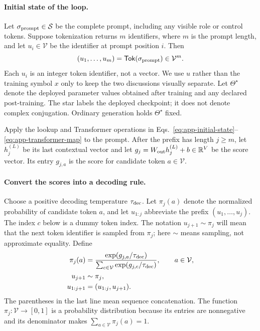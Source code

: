 \documentclass[
  aps,
  reprint,
  superscriptaddress,
  floatfix,
  nofootinbib,
  longbibliography
]{revtex4-2}
\newcommand{\R}{\mathbb{R}}
\begin{document}
\paragraph{Initial state of the loop.}
Let $\sigma_{\rm prompt}\in\mathcal S$ be the complete prompt, including any
visible role or control tokens.  Suppose tokenization returns $m$ identifiers,
where $m$ is the prompt length, and let $u_i\in\mathcal V$ be the identifier at
prompt position $i$.  Then
\begin{equation}
\label{eq:app-prompt-tokenization}
(u_1,\ldots,u_m)=\mathsf{Tok}(\sigma_{\rm prompt})
\in\mathcal V^m.
\end{equation}
Each $u_i$ is an integer token identifier, not a vector.  We use $u$ rather
than the training symbol $x$ only to keep the two discussions visually
separate.  Let $\Theta^\star$ denote the
deployed parameter values obtained after training and any declared
post-training.  The star labels the deployed checkpoint; it does not denote
complex conjugation.  Ordinary generation holds $\Theta^\star$ fixed.

Apply the lookup and Transformer operations in
Eqs.~\eqref{eq:app-initial-state}--\eqref{eq:app-transformer-map} to the prompt.
After the prefix has length $j\geq m$, let $h_j^{(L)}$ be its last contextual
vector and let
$g_j=W_{\rm out}h_j^{(L)}+b\in\R^V$ be the score vector.  Its entry $g_{j,a}$ is
the score for candidate token $a\in\mathcal V$.

\paragraph{Convert the scores into a decoding rule.}
Choose a positive decoding temperature $\tau_{\rm dec}$.  Let
$\pi_j(a)$ denote the normalized probability of candidate token $a$, and let
$u_{1:j}$ abbreviate the prefix $(u_1,\ldots,u_j)$.  The index $c$ below is a
dummy token index.  The notation $u_{j+1}\sim\pi_j$ will mean that the next
token identifier is sampled from $\pi_j$; here $\sim$ means sampling, not
approximate equality.  Define
%
\begin{align}
\pi_j(a)
&=
\frac{\exp(g_{j,a}/\tau_{\rm dec})}
{\sum_{c\in\mathcal V}
\exp(g_{j,c}/\tau_{\rm dec})},
\qquad a\in\mathcal V,
\nonumber\\
u_{j+1}&\sim\pi_j,
\nonumber\\
u_{1:j+1}&=(u_{1:j},u_{j+1}).
\label{eq:app-generation}
\end{align}
%
The parentheses in the last line mean sequence concatenation.  The function
$\pi_j:\mathcal V\to[0,1]$ is a probability distribution because its entries
are nonnegative and its denominator makes
$\sum_{a\in\mathcal V}\pi_j(a)=1$.
\end{document}
